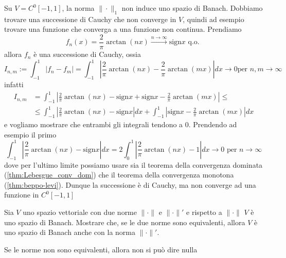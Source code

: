 \begin{example}\label{ex:non_banach}
    Su \(V = C^{0}[-1, 1]\), la norma \(\|\cdot \|_1\) non induce uno spazio di
    Banach. Dobbiamo trovare una successione di Cauchy che non converge in
    \(V\), quindi ad esempio trovare una funzione che converga a una funzione
    non continua.
    Prendiamo 
    \[
        f_{n}{(x)} = \frac{2}{\pi}\arctan {(nx)} \overset{n \to
        \infty}{\longrightarrow} \text{sign} x \text{ q.o. }
    \]
    allora \(f_{n}\) è una successione di Cauchy, ossia
    \[
        I_{n,m} := \int_{-1}^{1} |f_{n} - f_{m}| = \int_{-1}^{1} \left| \frac{2}{\pi}
        \arctan {(nx)} - \frac{2}{\pi} \arctan {(mx)} \right| dx \to 0 \text{
        per } n, m \to \infty 
    \]
    infatti
    \begin{align*}
        I_{n,m} &= \int_{-1} ^{1}\left| \frac{2}{\pi}\arctan {(nx)} -
        \text{sign}x + \text{sign}x - \frac{2}{\pi}\arctan {(mx)} \right| \le \\
        &\le \int_{-1} ^{1} \left| \frac{2}{\pi}\arctan {(nx)} - \text{sign}x
        \right| dx + \int_{-1} ^{1} \left| \text{sign}x - \frac{2}{\pi}\arctan
        {(mx)} \right| dx
    \end{align*}
    e vogliamo mostrare che entrambi gli integrali tendono a 0. Prendendo ad
    esempio il primo
    \[
        \int_{-1} ^{1} \left| \frac{2}{\pi}\arctan {(nx)} - \text{sign}x
        \right| dx = 2 \int_{0} ^{1} \left| \frac{2}{\pi}\arctan {(nx)} -
        1\right| dx \to 0 \text{ per } n \to \infty
    \]
    dove per l'ultimo limite possiamo usare sia il teorema della convergenza
    dominata (\ref{thm:Lebesgue_conv_dom}) che il teorema della convergenza
    monotona (\ref{thm:beppo-levi}). Dunque la successione è di Cauchy, ma non
    converge ad una funzione in \(C^{0}[-1, 1]\) 
\end{example}
\begin{eser}
    Sia \(V\) uno spazio vettoriale con due norme \(\|\cdot \|\) e \(\|\cdot
    \|'\) e rispetto a \(\|\cdot \|\) \(V\) è uno spazio di Banach. Mostrare
    che, se le due norme sono equivalenti, allora \(V\) è uno spazio di Banach
    anche con la norma \(\|\cdot \|'\).
\end{eser}
\begin{remark}
    Se le norme non sono equivalenti, allora non si può dire nulla
\end{remark}

